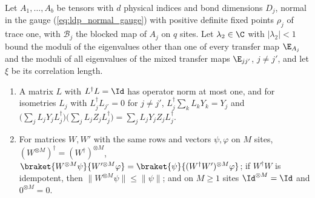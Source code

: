 \begin{lemma}
    \label{lem:ldp_shared_overlap_estimates}
    \leanok
    Let $A_1,\dots,A_b$ be tensors with $d$ physical indices and bond dimensions $D_j$,
    normal in the gauge (\ref{eq:ldp_normal_gauge}) with positive definite fixed points
    $\rho_j$ of trace one, with $\mathcal B_j$ the blocked map of $A_j$ on $q$ sites. Let
    $\lambda_2\in\C$ with $\lvert\lambda_2\rvert<1$ bound the moduli of the eigenvalues
    other than one of every transfer map $\E_{A_j}$ and the moduli of all eigenvalues of
    the mixed transfer maps $\E_{jj'}$, $j\neq j'$, and let $\xi$ be its correlation
    length.
    \begin{enumerate}
        \item A matrix $L$ with $L^\dagger L=\Id$ has operator norm at most one, and for
              isometries $L_j$ with $L_j^\dagger L_{j'}=0$ for $j\neq j'$,
              $L_j^\dagger\sum_kL_kY_k=Y_j$ and
              $\bigl(\sum_jL_jY_jL_j^\dagger\bigr)\bigl(\sum_jL_jZ_jL_j^\dagger\bigr)
                  =\sum_jL_jY_jZ_jL_j^\dagger$.
        \item For matrices $W,W'$ with the same rows and vectors $\psi,\varphi$ on $M$
              sites, $(W^{\otimes M})^\dagger=(W^\dagger)^{\otimes M}$,
              $\braket{W^{\otimes M}\psi}{W'^{\otimes M}\varphi}
                  =\braket{\psi}{(W^\dagger W')^{\otimes M}\varphi}$; if $W^\dagger W$ is
              idempotent, then $\lVert W^{\otimes M}\psi\rVert\leq\lVert\psi\rVert$; and on
              $M\geq1$ sites $\Id^{\otimes M}=\Id$ and $0^{\otimes M}=0$.

\end{enumerate}
\end{lemma}
